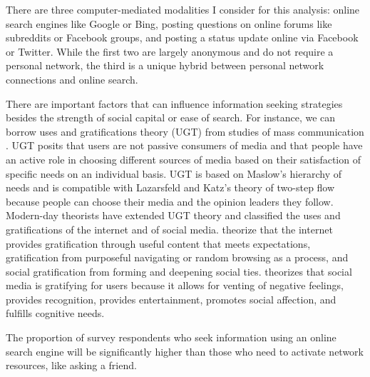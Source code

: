 There are three computer-mediated modalities I consider for this analysis: online
search engines like Google or Bing, posting questions on online forums like
subreddits or Facebook groups, and posting a status update online via Facebook
or Twitter. While the first two are largely anonymous and do not require a
personal network, the third is a unique hybrid between personal network
connections and online search.

There are important factors that can influence information seeking strategies
besides the strength of social capital or ease of search. For instance, we can
borrow uses and gratifications theory (UGT) from studies of mass communication
\citep{blumlerUsesMassCommunications1974, tanMassCommunicationTheories1985}. UGT
posits that users are not passive consumers of media and that people have an
active role in choosing different sources of media based on their satisfaction
of specific needs on an individual basis. UGT is based on Maslow’s
\citeyear{maslowTheoryHumanMotivation1943} hierarchy of needs and is compatible
with Lazarsfeld and Katz’s theory of two-step flow
\cite{katzPersonalInfluencePart1955} because people can choose their media and
the opinion leaders they follow. Modern-day theorists have extended UGT theory
and classified the uses and gratifications of the internet and of social media.
\citet{staffordDeterminingUsesGratifications2004} theorize that the internet
provides gratification through useful content that meets expectations,
gratification from purposeful navigating or random browsing as a process, and
social gratification from forming and deepening social ties.
\citet{leungGenerationalDifferencesContent2013} theorizes that social media is
gratifying for users because it allows for venting of negative feelings,
provides recognition, provides entertainment, promotes social affection, and
fulfills cognitive needs.

\begin{hyp} \label{hyp:online-vs-network}
The proportion of survey respondents who seek information
using an online search engine will be significantly higher than those who
need to activate network resources, like asking a friend.
\end{hyp}


